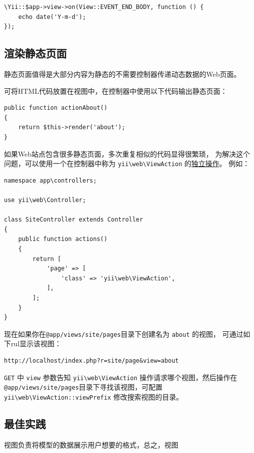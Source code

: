 \lstset{language=php}\begin{lstlisting}
\Yii::$app->view->on(View::EVENT_END_BODY, function () {
    echo date('Y-m-d');
});
\end{lstlisting}
\subsection{渲染静态页面 \label{structure-views.md::rendering-static-pages}}
静态页面值得是大部分内容为静态的不需要控制器传递动态数据的Web页面。

可将HTML代码放置在视图中，在控制器中使用以下代码输出静态页面：

\lstset{language=php}\begin{lstlisting}
public function actionAbout()
{
    return $this->render('about');
}
\end{lstlisting}
如果Web站点包含很多静态页面，多次重复相似的代码显得很繁琐，
为解决这个问题，可以使用一个在控制器中称为 \texttt{yii{\allowbreak{}\textbackslash}web{\allowbreak{}\textbackslash}ViewAction} 的\hyperref[structure-controllers.md::standalone-actions]{独立操作}。
例如：

\lstset{language=php}\begin{lstlisting}
namespace app\controllers;

use yii\web\Controller;

class SiteController extends Controller
{
    public function actions()
    {
        return [
            'page' => [
                'class' => 'yii\web\ViewAction',
            ],
        ];
    }
}
\end{lstlisting}
现在如果你在\lstinline|@app/views/site/pages|目录下创建名为 \lstinline|about| 的视图，
可通过如下rul显示该视图：

\begin{lstlisting}
http://localhost/index.php?r=site/page&view=about
\end{lstlisting}
\lstinline|GET| 中 \lstinline|view| 参数告知 \texttt{yii{\allowbreak{}\textbackslash}web{\allowbreak{}\textbackslash}ViewAction} 操作请求哪个视图，然后操作在
\lstinline|@app/views/site/pages|目录下寻找该视图，可配置 \texttt{yii{\allowbreak{}\textbackslash}web{\allowbreak{}\textbackslash}ViewAction\allowbreak{}::\allowbreak{}viewPrefix}
修改搜索视图的目录。

\subsection{最佳实践 \label{structure-views.md::best-practices}}
视图负责将模型的数据展示用户想要的格式，总之，视图

